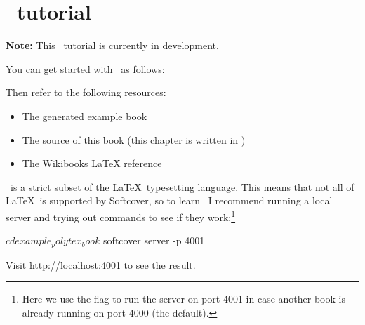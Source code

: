 \chapter{\PolyTeX\ tutorial} %
\label{cha:polytex_tutorial}

\noindent \textbf{Note:} This \PolyTeX\ tutorial is currently in development.

You can get started with \PolyTeX\ as follows:


\noindent Then refer to the following resources:

\begin{itemize}
\item The generated example book
\item The \href{https://github.com/softcover/softcover_book}{source of this book} (this chapter is written in \PolyTeX)
\item The \href{http://en.wikibooks.org/wiki/LaTeX}{Wikibooks LaTeX reference}
\end{itemize}

\PolyTeX\ is a strict subset of the \LaTeX\ typesetting language. This means that not all of \LaTeX\ is supported by Softcover, so to learn \PolyTeX\ I recommend running a local server and trying out commands to see if they work:\footnote{Here we use the  flag to run the server on port 4001 in case another book is already running on port 4000 (the default).}

\begin{code}
$ cd example_polytex_book
$ softcover server -p 4001
\end{code}

\noindent Visit \href{http://localhost:4001}{http://localhost:4001} to see the result.

